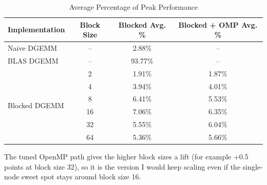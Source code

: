 \begin{table}[H]
\centering
\begin{tabular}{|l|c|c|c|}
\hline
\textbf{Implementation} & \textbf{Block Size} & \textbf{Blocked Avg. \%} & \textbf{Blocked + OMP Avg. \%} \\
\hline
\hline
Naive DGEMM & -- & 2.88\% & -- \\
\hline
BLAS DGEMM & -- & 93.77\% & -- \\
\hline
\hline
\multirow{6}{*}{Blocked DGEMM} 
& 2  & 1.91\% & 1.87\% \\
\cline{2-4}
& 4  & 3.94\% & 4.01\% \\
\cline{2-4}
& 8  & 6.41\% & 5.53\% \\
\cline{2-4}
& 16 & 7.06\% & 6.35\% \\
\cline{2-4}
& 32 & 5.55\% & 6.04\% \\
\cline{2-4}
& 64 & 5.36\% & 5.66\% \\
\hline
\end{tabular}
\caption{Average Percentage of Peak Performance}
\label{tab:performance-summary}
\end{table}

The tuned OpenMP path gives the higher block sizes a lift (for example +0.5 points at block size 32), so it is the version I would keep scaling even if the single-node sweet spot stays around block size 16.
